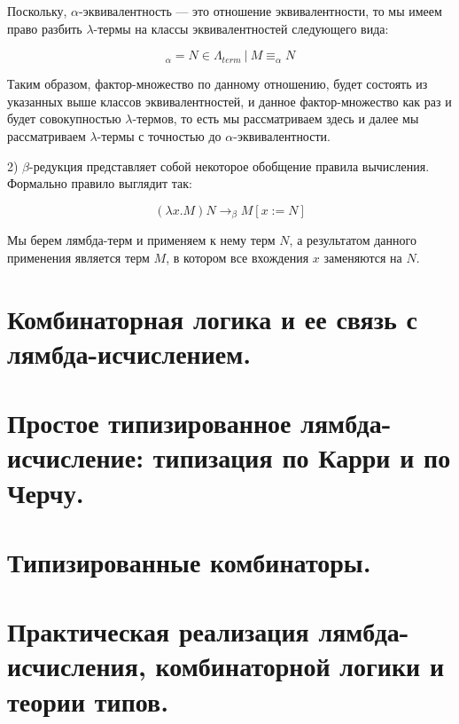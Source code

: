 \documentclass[a4paper]{article}
\begin{document}
Поскольку, $\alpha$-эквивалентность --- это отношение эквивалентности, то мы имеем право разбить $\lambda$-термы на классы эквивалентностей следующего вида:

\begin{equation}
[M]_{\alpha} = {N \in \Lambda_{term} \: | \: M \equiv_{\alpha} N}
\end{equation}

Таким образом, фактор-множество по данному отношению, будет состоять из указанных выше классов эквивалентностей, и данное фактор-множество как
раз и будет совокупностью $\lambda$-термов, то есть мы рассматриваем здесь и далее мы рассматриваем $\lambda$-термы с точностью до $\alpha$-эквивалентности.

2) $\beta$-редукция представляет собой некоторое обобщение правила вычисления. Формально правило выглядит так:

\begin{equation}
(\lambda x. M) N \rightarrow_{\beta} M[x := N]
\end{equation}

Мы берем лямбда-терм и применяем к нему терм $N$, а результатом данного применения является терм $M$, в котором все вхождения $x$ заменяются на $N$.


\section{Комбинаторная логика и ее связь с лямбда-исчислением.}
\section{Простое типизированное лямбда-исчисление: типизация по Карри и по Черчу.}
\section{Типизированные комбинаторы.}
\section{Практическая реализация лямбда-исчисления, комбинаторной логики и теории типов.}
\end{document}
